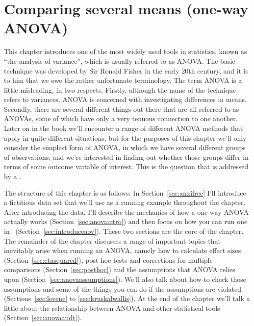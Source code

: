 

\chapter{Comparing several means (one-way ANOVA)\label{ch:anova}}

This chapter introduces one of the most widely used tools in statistics, known as ``the analysis of variance'', which is usually referred to as ANOVA. The basic technique was developed by Sir Ronald Fisher in the early 20th century, and it is to him that we owe the rather unfortunate terminology. The term ANOVA is a little misleading, in two respects. Firstly, although the name of the technique refers to variances, ANOVA is concerned with investigating differences in means. Secondly, there are several different things out there that are all referred to as ANOVAs, some of which have only a very tenuous connection to one another. Later on in the book we'll encounter a range of different ANOVA methods that apply in quite different situations, but for the purposes of this chapter we'll only consider the simplest form of ANOVA, in which we have several different groups of observations, and we're interested in finding out whether those groups differ in terms of some outcome variable of interest. This is the question that is addressed by a . 

The structure of this chapter is as follows: In Section~\ref{sec:anxifree} I'll introduce a fictitious data set that we'll use as a running example throughout the chapter. After introducing the data, I'll describe the mechanics of how a one-way ANOVA actually works (Section~\ref{sec:anovaintro}) and then focus on how you can run one in \R\ (Section~\ref{sec:introduceaov}). These two sections are the core of the chapter. The remainder of the chapter discusses a range of important topics that inevitably arise when running an ANOVA, namely how to calculate effect sizes (Section~\ref{sec:etasquared}), post hoc tests and corrections for multiple comparisons (Section~\ref{sec:posthoc}) and the assumptions that ANOVA relies upon (Section~\ref{sec:anovaassumptions}). We'll also talk about how to check those assumptions and some of the things you can do if the assumptions are violated (Sections~\ref{sec:levene} to \ref{sec:kruskalwallis}). At the end of the chapter we'll talk a little about the relationship between ANOVA and other statistical tools (Section~\ref{sec:anovaandt}). 



